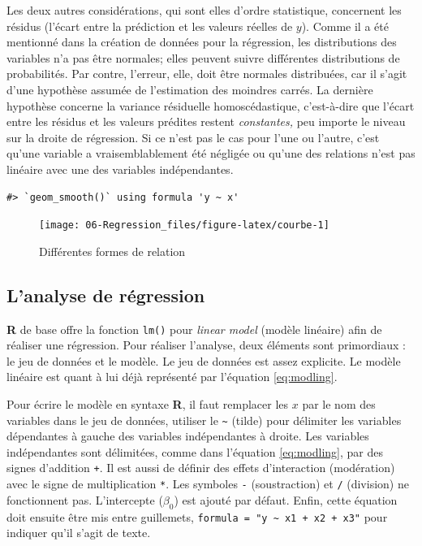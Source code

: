 \documentclass[
]{book}
\begin{document}
Les deux autres considérations, qui sont elles d'ordre statistique, concernent les résidus (l'écart entre la prédiction et les valeurs réelles de \(y\)). Comme il a été mentionné dans la création de données pour la régression, les distributions des variables n'a pas être normales; elles peuvent suivre différentes distributions de probabilités. Par contre, l'erreur, elle, doit être normales distribuées, car il s'agit d'une hypothèse assumée de l'estimation des moindres carrés. La dernière hypothèse concerne la variance résiduelle homoscédastique, c'est-à-dire que l'écart entre les résidus et les valeurs prédites restent \emph{constantes,} peu importe le niveau sur la droite de régression. Si ce n'est pas le cas pour l'une ou l'autre, c'est qu'une variable a vraisemblablement été négligée ou qu'une des relations n'est pas linéaire avec une des variables indépendantes.

\begin{verbatim}
#> `geom_smooth()` using formula 'y ~ x'
\end{verbatim}

\begin{figure}

{\centering \texttt{[image: 06-Regression\_files/figure-latex/courbe-1]} 

}

\caption{Différentes formes de relation}\label{fig:courbe}
\end{figure}

\hypertarget{lanalyse-de-ruxe9gression-1}{%
\subsection{L'analyse de régression}\label{lanalyse-de-ruxe9gression-1}}

\textbf{R} de base offre la fonction \texttt{lm()} pour \emph{linear model} (modèle linéaire) afin de réaliser une régression. Pour réaliser l'analyse, deux éléments sont primordiaux : le jeu de données et le modèle. Le jeu de données est assez explicite. Le modèle linéaire est quant à lui déjà représenté par l'équation \eqref{eq:modling}.

Pour écrire le modèle en syntaxe \textbf{R}, il faut remplacer les \(x\) par le nom des variables dans le jeu de données, utiliser le \texttt{\textasciitilde{}} (tilde) pour délimiter les variables dépendantes à gauche des variables indépendantes à droite. Les variables indépendantes sont délimitées, comme dans l'équation \eqref{eq:modling}, par des signes d'addition \texttt{+}. Il est aussi de définir des effets d'interaction (modération) avec le signe de multiplication \texttt{*}. Les symboles \texttt{-} (soustraction) et \texttt{/} (division) ne fonctionnent pas. L'intercepte (\(\beta_0\)) est ajouté par défaut. Enfin, cette équation doit ensuite être mis entre guillemets, \texttt{formula\ =\ "y\ \textasciitilde{}\ x1\ +\ x2\ +\ x3"} pour indiquer qu'il s'agit de texte.
\end{document}
